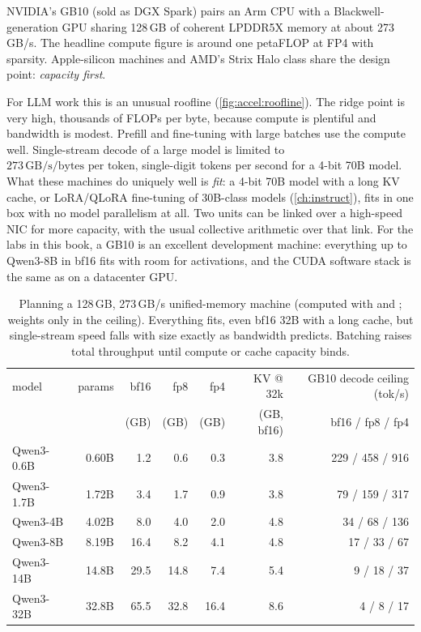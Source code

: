 NVIDIA's GB10 (sold as DGX Spark) pairs an Arm CPU with a Blackwell-generation GPU sharing
128\,GB of coherent LPDDR5X memory at about 273\,GB/s. The headline compute figure is around one
petaFLOP at FP4 with sparsity. Apple-silicon machines and AMD's Strix Halo class share the
design point: \emph{capacity first}.

For LLM work this is an unusual roofline (\cref{fig:accel:roofline}). The ridge point is very high,
thousands of FLOPs per byte, because compute is plentiful and bandwidth is modest. Prefill and fine-tuning with
large batches use the compute well. Single-stream decode of a large model is limited to
$273\,\text{GB/s}/\text{bytes per token}$, single-digit tokens per second for a 4-bit 70B model.
What these machines do uniquely well is \emph{fit}: a 4-bit 70B model with a long KV cache, or
LoRA/QLoRA fine-tuning of 30B-class models (\cref{ch:instruct}), fits in one box with no
model parallelism at all. Two units can be linked over a high-speed NIC for more capacity, with
the usual collective arithmetic over that link. For the labs in this book, a GB10 is an excellent
development machine: everything up to Qwen3-8B in bf16 fits with room for activations, and the CUDA
software stack is the same as on a datacenter GPU.

\begin{table}[t]
\centering\small
\begin{tabular}{lrrrrrr}
\toprule
model & params & bf16 & fp8 & fp4 & KV @ 32k & GB10 decode ceiling (tok/s)\\
& & (GB) & (GB) & (GB) & (GB, bf16) & bf16 / fp8 / fp4\\
\midrule
Qwen3-0.6B & 0.60B & 1.2 & 0.6 & 0.3 & 3.8 & 229 / 458 / 916\\
Qwen3-1.7B & 1.72B & 3.4 & 1.7 & 0.9 & 3.8 & 79 / 159 / 317\\
Qwen3-4B & 4.02B & 8.0 & 4.0 & 2.0 & 4.8 & 34 / 68 / 136\\
Qwen3-8B & 8.19B & 16.4 & 8.2 & 4.1 & 4.8 & 17 / 33 / 67\\
Qwen3-14B & 14.8B & 29.5 & 14.8 & 7.4 & 5.4 & 9 / 18 / 37\\
Qwen3-32B & 32.8B & 65.5 & 32.8 & 16.4 & 8.6 & 4 / 8 / 17\\
\bottomrule
\end{tabular}
\caption{Planning a 128\,GB, 273\,GB/s unified-memory machine (computed with 
and ; weights only in the ceiling). Everything fits, even bf16 32B
with a long cache, but single-stream speed falls with size exactly as bandwidth predicts. Batching
raises total throughput until compute or cache capacity binds.}
\label{tab:accel:gb10}
\end{table}

